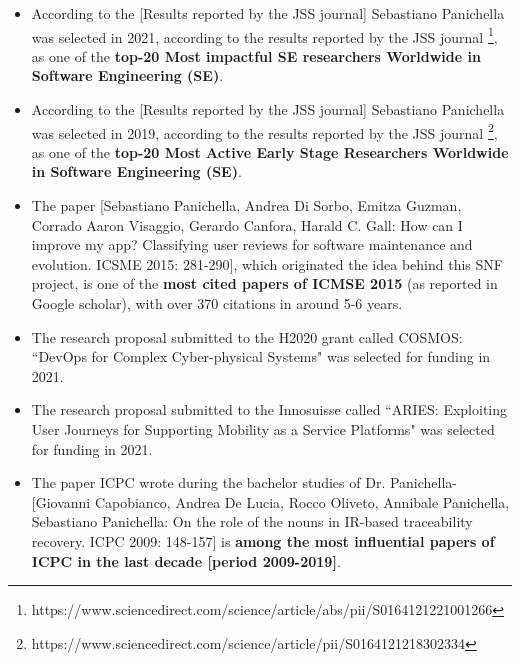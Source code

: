 \documentclass[10pt]{article}
\begin{document}
\vspace{-2.5mm}
\begin{itemize}
  \item According to the [Results reported by the JSS journal] Sebastiano Panichella was selected in 2021, according to the results reported by the JSS journal \footnote{https://www.sciencedirect.com/science/article/abs/pii/S0164121221001266}, as one of the \textbf{top-20 Most impactful SE researchers Worldwide in Software Engineering (SE)}. 
  \item According to the [Results reported by the JSS journal] Sebastiano Panichella was selected in 2019, according to the results reported by the JSS journal \footnote{https://www.sciencedirect.com/science/article/pii/S0164121218302334}, as one of the \textbf{top-20 Most Active Early Stage Researchers Worldwide in Software Engineering (SE)}. 
\vspace{-1.5mm}
  \item The paper [Sebastiano Panichella, Andrea Di Sorbo, Emitza Guzman, Corrado Aaron Visaggio, Gerardo Canfora, Harald C. Gall: How can I improve my app? Classifying user reviews for software maintenance and evolution. ICSME 2015: 281-290], which originated the idea behind this SNF project, is one of the \textbf{most cited papers of ICMSE 2015} (as reported in Google scholar), with over 370 citations in around 5-6 years.
  \item The research proposal submitted to the H2020 grant called COSMOS: ``DevOps for Complex Cyber-physical Systems" was selected for funding in 2021.
  \item The research proposal submitted to the Innosuisse called ``ARIES: Exploiting User Journeys for Supporting Mobility as a Service Platforms" was selected for funding in 2021.
\vspace{-1.5mm}
  \item The paper ICPC wrote during the bachelor studies of Dr. Panichella-[Giovanni Capobianco, Andrea De Lucia, Rocco Oliveto, Annibale Panichella, Sebastiano Panichella: On the role of the nouns in IR-based traceability recovery. ICPC 2009: 148-157] is \textbf{among the most influential papers of ICPC in the last decade [period 2009-2019]}.
  \vspace{-1.5mm}
\end{itemize}
\end{document}
